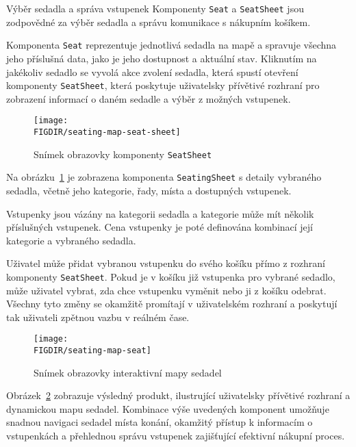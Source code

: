 \begin{subsection}{Výběr sedadla a správa vstupenek}
    \label{subsec:implementace-seating-seat}
    Komponenty \texttt{Seat} a \texttt{SeatSheet} jsou zodpovědné za výběr sedadla a správu komunikace s nákupním košíkem.

    Komponenta \texttt{Seat} reprezentuje jednotlivá sedadla na mapě a spravuje všechna jeho příslušná data, jako je jeho dostupnost a aktuální stav.
    Kliknutím na jakékoliv sedadlo se vyvolá akce zvolení sedadla, která spustí otevření komponenty \texttt{SeatSheet}, která poskytuje uživatelsky přívětivé rozhraní pro zobrazení informací o daném sedadle a výběr z možných vstupenek.

    \begin{figure}[h]
        \centering
        \caption{Snímek obrazovky komponenty \texttt{SeatSheet}}
        \texttt{[image: \\FIGDIR/seating-map-seat-sheet]}
        \source{}
        \label{fig:seating-map-seats-sheet}
    \end{figure}

    Na obrázku~\ref{fig:seating-map-seats-sheet} je zobrazena komponenta \texttt{SeatingSheet} s detaily vybraného sedadla, včetně jeho kategorie, řady, místa a dostupných vstupenek.

    \pagebreak
    Vstupenky jsou vázány na kategorii sedadla a kategorie může mít několik příslušných vstupenek.
    Cena vstupenky je poté definována kombinací její kategorie a vybraného sedadla.

    Uživatel může přidat vybranou vstupenku do svého košíku přímo z rozhraní komponenty \texttt{SeatSheet}.
    Pokud je v košíku již vstupenka pro vybrané sedadlo, může uživatel vybrat, zda chce vstupenku vyměnit nebo ji z košíku odebrat.
    Všechny tyto změny se okamžitě promítají v uživatelském rozhraní a poskytují tak uživateli zpětnou vazbu v reálném čase.

    \begin{figure}[h]
        \centering
        \caption{Snímek obrazovky interaktivní mapy sedadel}
        \texttt{[image: \\FIGDIR/seating-map-seat]}
        \source{}
        \label{fig:seating-map-seat}
    \end{figure}

    Obrázek~\ref{fig:seating-map-seat} zobrazuje výsledný produkt, ilustrující uživatelsky přívětivé rozhraní a dynamickou mapu sedadel.
    Kombinace výše uvedených komponent umožňuje snadnou navigaci sedadel místa konání, okamžitý přístup k informacím o vstupenkách a přehlednou správu vstupenek zajišťující efektivní nákupní proces.
\end{subsection}
